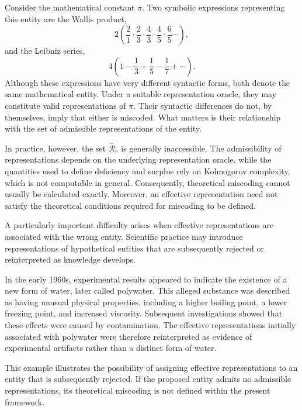 \begin{example}
\label{ex:leibniz-wallis}
Consider the mathematical constant $\pi$. Two symbolic expressions representing this entity are the Wallis product,
\[
2\left(\frac{2}{1}\cdot\frac{2}{3}\cdot\frac{4}{3}
\cdot\frac{4}{5}\cdot\frac{6}{5}\cdots\right),
\]
and the Leibniz series,
\[
4\left(1-\frac{1}{3}+\frac{1}{5}-\frac{1}{7}+\cdots\right).
\]
Although these expressions have very different syntactic forms, both denote the same mathematical entity. Under a suitable representation oracle, they may constitute valid representations of $\pi$. Their syntactic differences do not, by themselves, imply that either is miscoded. What matters is their relationship with the set of admissible representations of the entity.
\end{example}

In practice, however, the set $\bar{\mathcal{R}}_e$ is generally inaccessible. The admissibility of representations depends on the underlying representation oracle, while the quantities used to define deficiency and surplus rely on Kolmogorov complexity, which is not computable in general. Consequently, theoretical miscoding cannot usually be calculated exactly. Moreover, an effective representation need not satisfy the theoretical conditions required for miscoding to be defined.

A particularly important difficulty arises when effective representations are associated with the wrong entity. Scientific practice may introduce representations of hypothetical entities that are subsequently rejected or reinterpreted as knowledge develops.

\begin{example}
\label{ex:polywater}
In the early 1960s, experimental results appeared to indicate the existence of a new form of water, later called polywater. This alleged substance was described as having unusual physical properties, including a higher boiling point, a lower freezing point, and increased viscosity. Subsequent investigations showed that these effects were caused by contamination. The effective representations initially associated with polywater were therefore reinterpreted as evidence of experimental artifacts rather than a distinct form of water.
\end{example}

This example illustrates the possibility of assigning effective representations to an entity that is subsequently rejected. If the proposed entity admits no admissible representations, its theoretical miscoding is not defined within the present framework.

